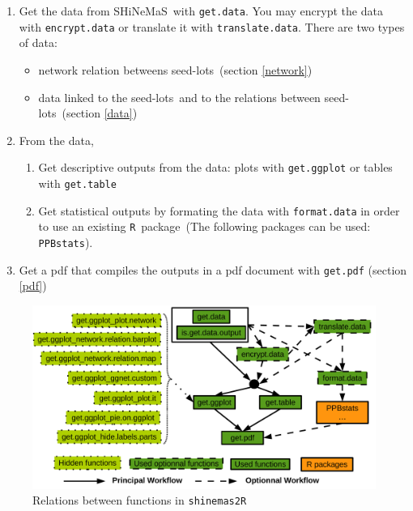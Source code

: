 \documentclass{article}\usepackage[]{graphicx}\usepackage[]{color}
\newcommand{\R}{\texttt{R}}
\renewcommand{\sl}{seed-lots}
\newcommand{\BD}{SHiNeMaS}
\newcommand{\pack}{\texttt{shinemas2R}}
\newcommand{\listpackformatdata}{\texttt{PPBstats}}
\begin{document}
\begin{enumerate}
\item Get the data from \BD~with \texttt{get.data}. You may encrypt the data with \texttt{encrypt.data} or translate it with \texttt{translate.data}.
There are two types of data:
\begin{itemize}
\item network relation betweens \sl~(section \ref{network})
\item data linked to the \sl~and to the relations between \sl~(section \ref{data})
\end{itemize}

\item From the data,
	\begin{enumerate}
	\item Get descriptive outputs from the data: plots with \texttt{get.ggplot} or tables with \texttt{get.table}
	\item Get statistical outputs by formating the data with \texttt{format.data} in order to use an existing \R~package~(The following packages can be used: \listpackformatdata).
	\end{enumerate}
\item Get a pdf that compiles the outputs in a pdf document with \texttt{get.pdf} (section \ref{pdf})
\end{enumerate}


\begin{figure}[H]
\begin{center}
%
\includegraphics[width=\textwidth]{shinemas2R_function_relations}
\end{center}
\caption{Relations between functions in \pack}
\label{function_relations}
\end{figure}
\end{document}
